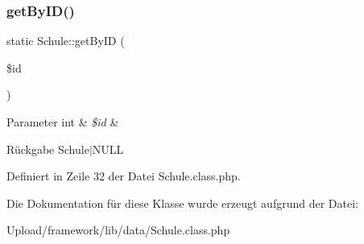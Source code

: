 \subsubsection{\texorpdfstring{get\+By\+I\+D()}{getByID()}}
{\footnotesize\ttfamily static Schule\+::get\+By\+ID (\begin{DoxyParamCaption}\item[{}]{\$id }\end{DoxyParamCaption})\hspace{0.3cm}{\ttfamily [static]}}


\begin{DoxyParams}[1]{Parameter}
int & {\em \$id} & \\
\hline
\end{DoxyParams}
\begin{DoxyReturn}{Rückgabe}
Schule$\vert$\+N\+U\+LL 
\end{DoxyReturn}


Definiert in Zeile 32 der Datei Schule.\+class.\+php.



Die Dokumentation für diese Klasse wurde erzeugt aufgrund der Datei\+:\begin{DoxyCompactItemize}
\item 
Upload/framework/lib/data/Schule.\+class.\+php\end{DoxyCompactItemize}
